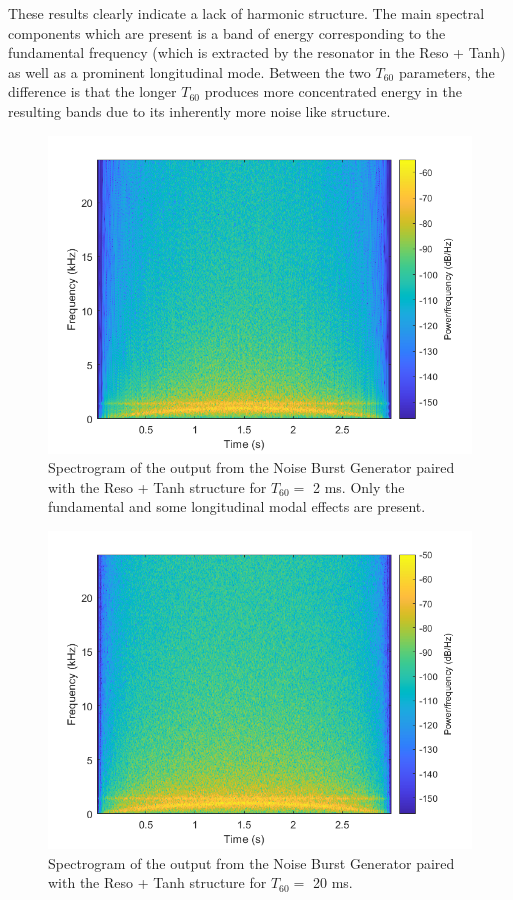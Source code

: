 \documentclass[../main.tex]{subfiles}
\begin{document}
These results clearly indicate a lack of harmonic structure. The main spectral components which are present is a band of energy corresponding to the fundamental frequency (which is extracted by the resonator in the Reso + Tanh) as well as a prominent longitudinal mode. Between the two $T_{60}$ parameters, the difference is that the longer $T_{60}$ produces more concentrated energy in the resulting bands due to its inherently more noise like structure.

\clearpage

\begin{figure}[h!]
    \centering
    \includegraphics[scale=.60]{./images/plots/NBG-RT-T60-Short.png}
    \caption{Spectrogram of the output from the Noise Burst Generator paired with the Reso + Tanh structure for $T_{60} = $ 2 ms. Only the fundamental and some longitudinal modal effects are present.}
    \label{fig:NBG_RT_T60_Short}
\end{figure}

\begin{figure}[h!]
    \centering
    \includegraphics[scale=.60]{./images/plots/NBG-RT-T60-Long.png}
    \caption{Spectrogram of the output from the Noise Burst Generator paired with the Reso + Tanh structure for $T_{60} = $ 20 ms.}
    \label{fig:NBG_RT_T60_Long}
\end{figure}
\end{document}
